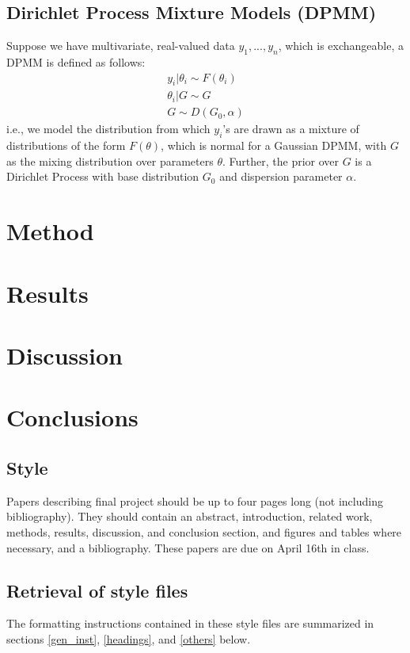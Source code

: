 \documentclass{article} %
\begin{document}
\subsection{Dirichlet Process Mixture Models (DPMM)}
Suppose we have multivariate, real-valued data $y_1,...,y_n$, which is exchangeable, a DPMM is defined as follows:
\begin{eqnarray*}
y_i|\theta_i \sim F(\theta_i)\\
\theta_i|G \sim G\\
G \sim D(G_0, \alpha)
\end{eqnarray*}
i.e., we model the distribution from which $y_i$'s are drawn as a mixture of distributions of the form $F(\theta)$, which is normal for a Gaussian DPMM, with $G$ as the mixing distribution over parameters $\theta$. Further, the prior over $G$ is a Dirichlet Process with base distribution $G_0$ and dispersion parameter $\alpha$.


\section{Method}
\section{Results}
\section{Discussion}
\section{Conclusions}

\subsection{Style}

Papers describing final project should be up to four pages long (not including bibliography). They should contain an abstract, introduction, related work, methods, results, discussion, and conclusion section, and figures and tables where necessary, and a bibliography. These papers are due on April 16th in class.


\subsection{Retrieval of style files}

The formatting instructions contained in these style files are summarized in
sections \ref{gen_inst}, \ref{headings}, and \ref{others} below.
\end{document}

